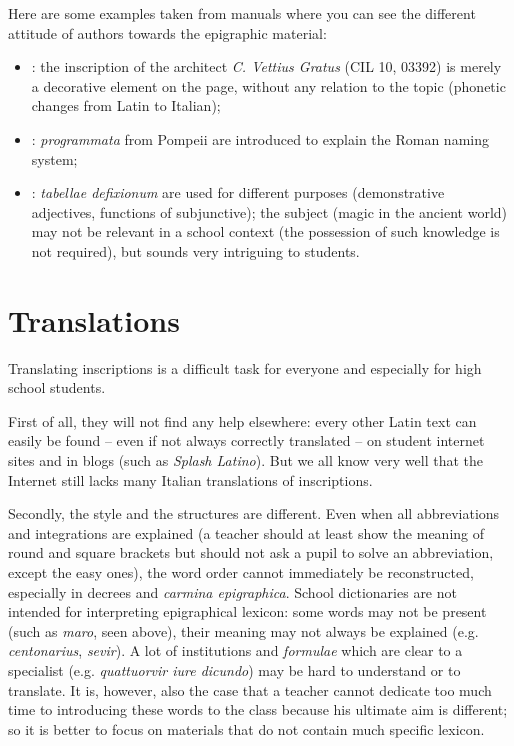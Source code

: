 \documentclass[amsthm,ebook]{saparticle}
\begin{document}
Here are some examples taken from manuals where you can see the different attitude of authors towards the epigraphic
material:

\begin{itemize}
\item \citet[39]{Barbieri2015}: the inscription of the architect \emph{C. Vettius Gratus} (CIL 10, 03392) is
merely a decorative element on the page, without any relation to the topic (phonetic changes from Latin to Italian);

\item \citet[40]{Domenici2012}: \emph{programmata} from Pompeii are introduced to explain the Roman
naming system;

\item \citet[269-270]{Gambis2013}: \emph{tabellae defixionum} are used for
different purposes (demonstrative adjectives, functions of subjunctive); the subject (magic in the ancient world) may
not be relevant in a school context (the possession of such knowledge is not required), but sounds very intriguing to
students.
\end{itemize}



\section{Translations}
\noindent Translating inscriptions is a difficult task for everyone and especially for high school students.

First of all, they will not find any help elsewhere: every other Latin text can easily be found – even if not always
correctly translated – on student internet sites and in blogs (such as \emph{Splash Latino}). But we all know very well that
the Internet still lacks many Italian translations of inscriptions.

Secondly, the style and the structures are different. Even when all abbreviations and integrations are explained (a
teacher should at least show the meaning of round and square brackets but should not ask a pupil to solve an
abbreviation, except the easy ones), the word order cannot immediately be reconstructed, especially in decrees and
\emph{carmina epigraphica}. School dictionaries are not intended for interpreting epigraphical lexicon: some words may not be
present (such as \emph{maro}, seen above), their meaning may not always be explained 
(e.g. \emph{centonarius}, \emph{sevir}). A lot of institutions and \emph{formulae} which are clear to a specialist
(e.g. \emph{quattuorvir iure dicundo}) may be hard to understand or to translate. It is, however, also the case that a teacher
cannot dedicate too much time to introducing these words to the class because his ultimate aim is different; so it is
better to focus on materials that do not contain much specific lexicon.
\end{document}
